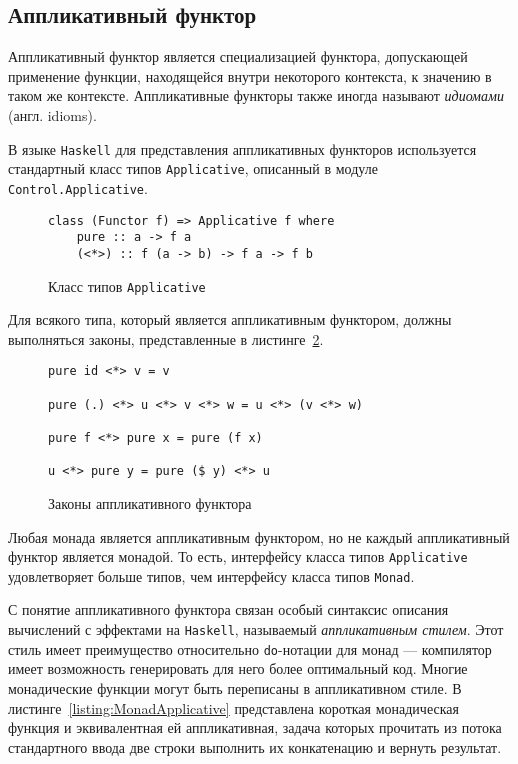 \subsection{Аппликативный функтор}

Аппликативный функтор является специализацией функтора, допускающей применение 
функции, находящейся внутри некоторого контекста, к значению в таком же 
контексте. Аппликативные функторы также иногда называют \emph{идиомами} 
(англ. idioms).

В языке \lstinline{Haskell} для представления аппликативных функторов 
используется стандартный класс типов \lstinline{Applicative}, 
описанный в модуле \lstinline{Control.Applicative}.

\begin{figure}[h]
\begin{lstlisting}
class (Functor f) => Applicative f where
    pure :: a -> f a
    (<*>) :: f (a -> b) -> f a -> f b
\end{lstlisting}
\caption{Класс типов \lstinline{Applicative}}
\label{listing:Applicative}
\end{figure}

Для всякого типа, который является аппликативным функтором, должны выполняться 
законы, представленные в листинге~\ref{listing:ApplicativeLaws}.

\begin{figure}[h]
\begin{lstlisting}
pure id <*> v = v

pure (.) <*> u <*> v <*> w = u <*> (v <*> w)

pure f <*> pure x = pure (f x)

u <*> pure y = pure ($ y) <*> u
\end{lstlisting}
\caption{Законы аппликативного функтора}
\label{listing:ApplicativeLaws}
\end{figure}

Любая монада является аппликативным функтором, но не каждый аппликативный 
функтор является монадой. То есть, интерфейсу класса типов 
\lstinline{Applicative} удовлетворяет больше типов, чем интерфейсу класса типов 
\lstinline{Monad}.

С понятие аппликативного функтора связан особый синтаксис описания вычислений с 
эффектами на \lstinline{Haskell}, называемый \emph{аппликативным стилем}. Этот 
стиль имеет преимущество относительно \lstinline{do}-нотации для монад --- 
компилятор имеет возможность генерировать для него более оптимальный код. 
Многие монадические функции могут быть переписаны в аппликативном стиле. 
В листинге~\ref{listing:MonadApplicative} представлена короткая монадическая 
функция и эквивалентная ей аппликативная, задача которых прочитать из потока 
стандартного ввода две строки выполнить их конкатенацию и вернуть результат.

